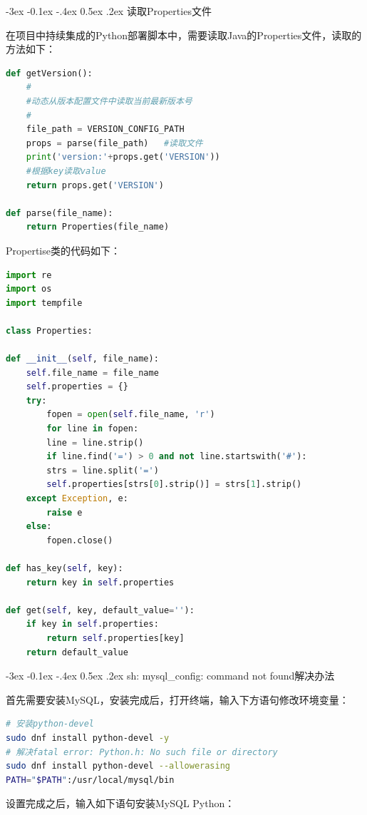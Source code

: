 \documentclass[12pt]{book}
\makeatletter
\numberwithin{dummy}{section}
\theoremstyle{ocrenumbox}
\theoremstyle{blacknumex}
\theoremstyle{blacknumbox}
\theoremstyle{ocrenum}
\renewcommand{\subsection}{\@startsection {subsection}{2}{\z@}
	{-3ex \@plus -0.1ex \@minus -.4ex}
	{0.5ex \@plus.2ex }
	{\normalfont\sffamily\bfseries}}
\makeatother
\begin{document}
\subsection{读取Properties文件}

在项目中持续集成的Python部署脚本中，需要读取Java的Properties文件，读取的方法如下：

\begin{lstlisting}[language=Python]
def getVersion():
	#
	#动态从版本配置文件中读取当前最新版本号
	#
	file_path = VERSION_CONFIG_PATH
	props = parse(file_path)   #读取文件
	print('version:'+props.get('VERSION'))
	#根据key读取value
	return props.get('VERSION')            

def parse(file_name):
	return Properties(file_name)
\end{lstlisting}

Propertise类的代码如下：

\begin{lstlisting}[language=Python]
import re
import os
import tempfile

class Properties:

def __init__(self, file_name):
	self.file_name = file_name
	self.properties = {}
	try:
		fopen = open(self.file_name, 'r')
		for line in fopen:
		line = line.strip()
		if line.find('=') > 0 and not line.startswith('#'):
		strs = line.split('=')
		self.properties[strs[0].strip()] = strs[1].strip()
	except Exception, e:
		raise e
	else:
		fopen.close()

def has_key(self, key):
	return key in self.properties

def get(self, key, default_value=''):
	if key in self.properties:
		return self.properties[key]
	return default_value
\end{lstlisting}


\subsection{sh: mysql\_config: command not found解决办法}

首先需要安装MySQL，安装完成后，打开终端，输入下方语句修改环境变量：

\begin{lstlisting}[language=Bash]
# 安装python-devel
sudo dnf install python-devel -y
# 解决fatal error: Python.h: No such file or directory
sudo dnf install python-devel --allowerasing
PATH="$PATH":/usr/local/mysql/bin
\end{lstlisting}

设置完成之后，输入如下语句安装MySQL Python：
\end{document}
